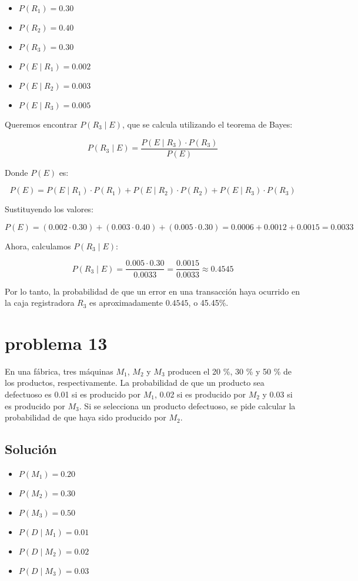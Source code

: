 \documentclass[12pt,a4paper]{article}
\begin{document}
\begin{itemize}
    \item \( P(R_1) = 0.30 \)
    \item \( P(R_2) = 0.40 \)
    \item \( P(R_3) = 0.30 \)
    \item \( P(E \mid R_1) = 0.002 \)
    \item \( P(E \mid R_2) = 0.003 \)
    \item \( P(E \mid R_3) = 0.005 \)
\end{itemize}

Queremos encontrar \( P(R_3 \mid E) \), que se calcula utilizando el teorema de Bayes:

\[
P(R_3 \mid E) = \frac{P(E \mid R_3) \cdot P(R_3)}{P(E)}
\]

Donde \( P(E) \) es:

\[
P(E) = P(E \mid R_1) \cdot P(R_1) + P(E \mid R_2) \cdot P(R_2) + P(E \mid R_3) \cdot P(R_3)
\]

Sustituyendo los valores:

\[
P(E) = (0.002 \cdot 0.30) + (0.003 \cdot 0.40) + (0.005 \cdot 0.30) = 0.0006 + 0.0012 + 0.0015 = 0.0033
\]

Ahora, calculamos \( P(R_3 \mid E) \):

\[
P(R_3 \mid E) = \frac{0.005 \cdot 0.30}{0.0033} = \frac{0.0015}{0.0033} \approx 0.4545
\]

Por lo tanto, la probabilidad de que un error en una transacción haya ocurrido en la caja registradora \( R_3 \) es aproximadamente \( 0.4545 \), o 45.45\%.

\newpage 
\section*{problema 13}
En una fábrica, tres máquinas \( M_1 \), \( M_2 \) y \( M_3 \) producen el 20 \%, 30 \% y 50 \% de los productos, respectivamente. La probabilidad de que un producto sea defectuoso es 0.01 si es producido por \( M_1 \), 0.02 si es producido por \( M_2 \) y 0.03 si es producido por \( M_3 \). Si se selecciona un producto defectuoso, se pide calcular la probabilidad de que haya sido producido por \( M_2 \).

\subsection*{Solución}

\begin{itemize}
    \item \( P(M_1) = 0.20 \)
    \item \( P(M_2) = 0.30 \)
    \item \( P(M_3) = 0.50 \)
    \item \( P(D \mid M_1) = 0.01 \)
    \item \( P(D \mid M_2) = 0.02 \)
    \item \( P(D \mid M_3) = 0.03 \)
\end{itemize}
\end{document}
